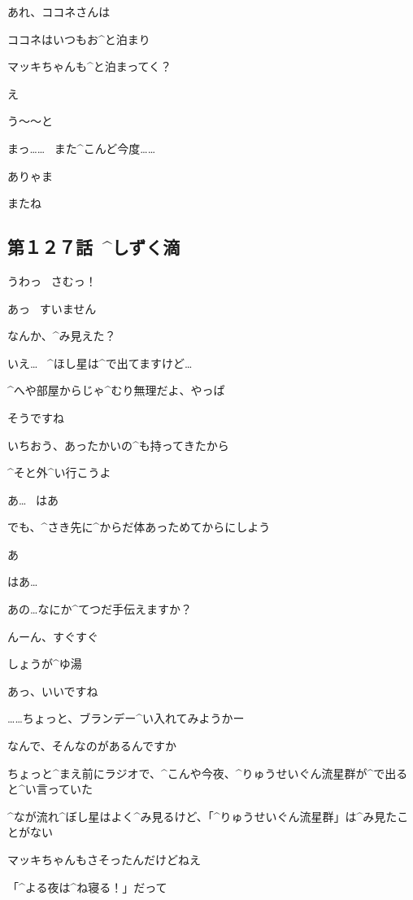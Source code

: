 \Makki あれ、ココネさんは

\Alpha ココネはいつもお^{と}{泊}まり

\Alpha マッキちゃんも^{と}{泊}まってく？

\Makki え

\page[97]
\Makki う〜〜と

\Makki まっ……
\ また^{こんど}{今度}……

\Alpha ありゃま

\Kokone またね


\subsection{第１２７話\ ^{しずく}{滴}}

\page[101]
\Alpha うわっ
\ さむっ！

\Kokone あっ
\ すいません

\Alpha なんか、^{み}{見}えた？

\Kokone いえ…
\ ^{ほし}{星}は^{で}{出}てますけど…

\Alpha ^{へや}{部屋}からじゃ^{むり}{無理}だよ、やっぱ

\Kokone そうですね

\page[102]
\Alpha いちおう、あったかいの^{も}{持}ってきたから

\Alpha ^{そと}{外}^{い}{行}こうよ

\Kokone あ…
\ はあ

\Alpha でも、^{さき}{先}に^{からだ}{体}あっためてからにしよう

\Kokone あ

\Kokone はあ…

\Kokone あの…なにか^{てつだ}{手伝}えますか？

\Alpha んーん、すぐすぐ

\page[103]
\Alpha しょうが^{ゆ}{湯}

\Kokone あっ、いいですね

\Alpha ……ちょっと、ブランデー^{い}{入}れてみようかー

\Kokone なんで、そんなのがあるんですか

\page[104]
\Alpha ちょっと^{まえ}{前}にラジオで、^{こんや}{今夜}、^{りゅうせいぐん}{流星群}が^{で}{出}ると^{い}{言}っていた

\Alpha ^{なが}{流}れ^{ぼし}{星}はよく^{み}{見}るけど、「^{りゅうせいぐん}{流星群}」は^{み}{見}たことがない

\Alpha マッキちゃんもさそったんだけどねえ

\Alpha 「^{よる}{夜}は^{ね}{寝}る！」だって

